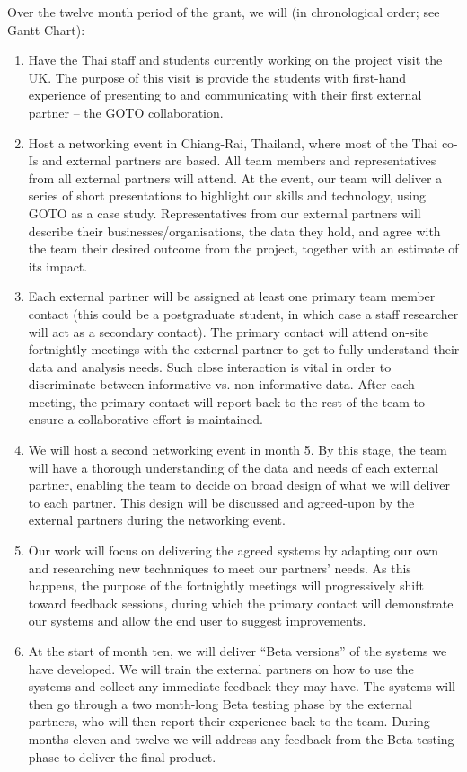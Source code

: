 \documentclass[11pt]{article}
\begin{document}
  \noindent
  Over the twelve month period of the grant, we will (in chronological order; see Gantt Chart):
  \begin{enumerate}[leftmargin=6mm,itemsep=0pt,topsep=1pt]
  \item Have the Thai staff and students currently working on the project visit the UK. The purpose of this visit is provide the students with first-hand experience of presenting to and communicating with their first external partner -- the GOTO collaboration.
  \item Host a networking event in Chiang-Rai, Thailand, where most of the Thai co-Is and external partners are based. All team members and representatives from all external partners will attend. At the event, our team will deliver a series of short presentations to highlight our skills and technology, using GOTO as a case study. Representatives from our external partners will describe their businesses/organisations, the data they hold, and agree with the team their desired outcome from the project, together with an estimate of its impact.
  \item Each external partner will be assigned at least one primary team member contact (this could be a postgraduate student, in which case a staff researcher will act as a secondary contact). The primary contact will attend on-site fortnightly meetings with the external partner to get to fully understand their data and analysis needs. Such close interaction is vital in order to discriminate between informative vs. non-informative data. After each meeting, the primary contact will report back to the rest of the team to ensure a collaborative effort is maintained.
  \item We will host a second networking event in month 5. By this stage, the team will have a thorough understanding of the data and needs of each external partner, enabling the team to decide on broad design of what we will deliver to each partner. This design will be discussed and agreed-upon by the external partners during the networking event. 
  \item Our work will focus on delivering the agreed systems by adapting our own and researching new technniques to meet our partners' needs. As this happens, the purpose of the fortnightly meetings will progressively shift toward feedback sessions, during which the primary contact will demonstrate our systems and allow the end user to suggest improvements. 
  \item At the start of month ten, we will deliver ``Beta versions'' of the systems we have developed. We will train the external partners on how to use the systems and collect any immediate feedback they may have. The systems will then go through a two month-long Beta testing phase by the external partners, who will then report their experience back to the team. During months eleven and twelve we will address any feedback from the Beta testing phase to deliver the final product.

\end{enumerate}
\end{document}
